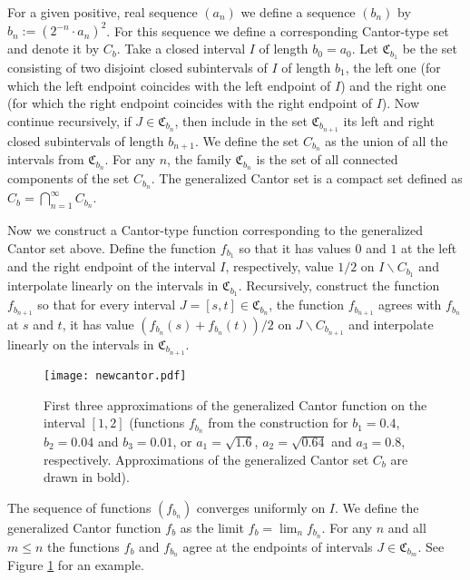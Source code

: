 \documentclass[11pt,reqno]{amsart}
\theoremstyle{plain}
\theoremstyle{definition}
\theoremstyle{remark}
\begin{document}
For a given positive, real sequence $(a_n)$ we define a sequence $(b_{n})$ by $b_{n}:= (2^{-n} \cdot a_{n})^2$. For this sequence we define a corresponding Cantor-type set and denote it by $C_{b}$.
Take a closed interval $I$ of length $b_0=a_0$. Let $\mathfrak{C}_{b_{1}}$ be the set consisting of two disjoint closed subintervals of $I$ of length $b_{1}$, the left one (for which the left endpoint coincides with the left endpoint of $I$) and the right one (for which the right endpoint coincides with the right endpoint of $I$).
Now continue recursively, if $J \in \mathfrak{C}_{b_{n}}$, then include in the set $\mathfrak{C}_{b_{n +1}}$ its left and right closed subintervals of length $b_{n +1}$. We define the set $C_{b_{n}}$ as the union of all the intervals from $\mathfrak{C}_{b_{n}}$.
For any $n$, the family $\mathfrak{C}_{b_{n}}$ is the set of all connected components of the set $C_{b_{n}}$.
The generalized Cantor set is a compact set defined as $C_b=\bigcap_{n=1}^\infty C_{b_{n}}$.

Now we construct a Cantor-type function corresponding to the generalized Cantor set above. Define the function $f_{b_{1}}$ so that it has values $0$ and $1$ at the left and the right endpoint of the interval $I$, respectively, value $1/2$ on $I\backslash {C}_{b_{1}}$ and interpolate linearly on the intervals in $\mathfrak{C}_{b_{1}}$. Recursively, construct the function $f_{b_{n +1}}$ so that for every interval $J =[s,t]\in \mathfrak{C}_{b_{n}}$, the function $f_{b_{n +1}}$ agrees with $f_{b_n}$ at $s$ and $t$, it has value $(f_{b_n}(s)+f_{b_n}(t))/2$ on $J \backslash C_{b_{n +1}}$ and interpolate linearly on the intervals in $\mathfrak{C}_{b_{n +1}}$. 

\begin{figure}

\texttt{[image: newcantor.pdf]}

\caption{First three approximations of the generalized Cantor function on the interval $[1,2]$ (functions $f_{b_n}$ from the construction for $b_1=0.4$, $b_2=0.04$ and $b_3=0.01$, or $a_1=\sqrt{1.6}$, $a_2=\sqrt{0.64}$ and $a_3=0.8$, respectively. Approximations of the generalized Cantor set $C_{b}$ are drawn in bold).}

\label{fig:cantorII}

\end{figure}

The sequence of functions $(f_{b_n})$ converges uniformly on $I$.
We define the generalized Cantor function $f_b$ as the limit $f_b=\lim_n f_{b_n}$.
For any $n$ and all $m \leq n$ the functions $f_b$ and $f_{b_n}$ agree at the endpoints of intervals $J \in \mathfrak{C}_{b_m}$. See Figure \ref{fig:cantorII} for an example.
\end{document}

